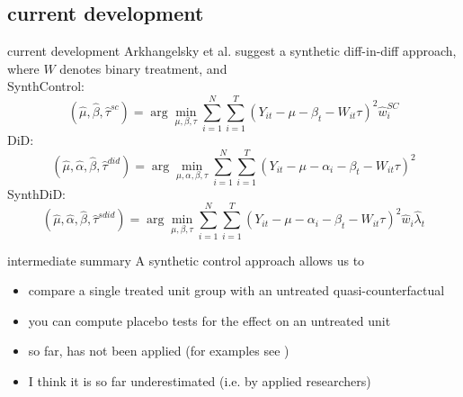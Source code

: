 \documentclass[aspectratio=169]{beamer}
\begin{document}
	\subsection{current development}
		\begin{frame}{current development}
			Arkhangelsky et al. \citeyear{Arkhangelsky2021} suggest a synthetic diff-in-diff approach, where $W$ denotes binary treatment, and\\ \vspace*{.15cm}
			SynthControl:
			\begin{equation}
				(\hat{\mu}, \hat{\beta}, \hat{\tau}^{sc}) = \arg\min_{\mu, \beta, \tau}  \sum_{i=1}^{N} \sum_{i=1}^{T} \left(Y_{it} - \mu - \beta_t - W_{it}\tau \right)^2 \hat{w}_i^{SC}
			\end{equation}
			DiD:
			\begin{equation}
				(\hat{\mu}, \hat{\alpha}, \hat{\beta}, \hat{\tau}^{did}) = \arg\min_{\mu, \alpha, \beta, \tau}  \sum_{i=1}^{N} \sum_{i=1}^{T} \left(Y_{it} - \mu - \alpha_i -\beta_t - W_{it}\tau \right)^2
			\end{equation}
			SynthDiD:
			\begin{equation}
				(\hat{\mu}, \hat{\alpha}, \hat{\beta}, \hat{\tau}^{sdid}) = \arg\min_{\mu, \beta, \tau}  \sum_{i=1}^{N} \sum_{i=1}^{T} \left(Y_{it} - \mu - \alpha_i -\beta_t - W_{it}\tau \right)^2 \hat{w}_i \hat{\lambda}_t
			\end{equation}
		\end{frame}

		\begin{frame}{intermediate summary}
			A synthetic control approach allows us to \\ \vspace*{.5cm}
			\begin{itemize}
				\item compare a single treated unit group with an untreated quasi-counterfactual
				\item you can compute placebo tests for the effect on an untreated unit
				\item so far, has not been  applied (for examples see \cite{Abadie2020b})
				\item I think it is so far underestimated (i.e. by applied researchers)
			\end{itemize}
		\end{frame}
\end{document}
